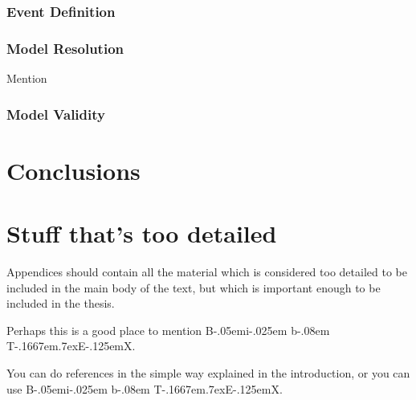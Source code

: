 \documentclass[12pt,a4paper]{report}
\def\BibTeX{{\rm B\kern-.05em{\sc i\kern-.025em b}\kern-.08em
    T\kern-.1667em\lower.7ex\hbox{E}\kern-.125emX}}
\begin{document}
\subsection{Event Definition}\label{subsec:diseventdef}



\subsection{Model Resolution}\label{subsec:dismodeldef}

Mention~\cite{Kendon_Fischer_Short_2023}

\subsection{Model Validity}\label{subsec:dismodelvalid}

\chapter{Conclusions}\label{ch:conclusions}

\appendix


\chapter{Stuff that's too detailed}

Appendices should contain all the material which is considered too
detailed to be included in the main body of the text, but which is
important enough to be included in the thesis.

Perhaps this is a good place to mention \BibTeX.

You can do references in the simple way explained in the introduction,
or you can use \BibTeX.




\end{document}
